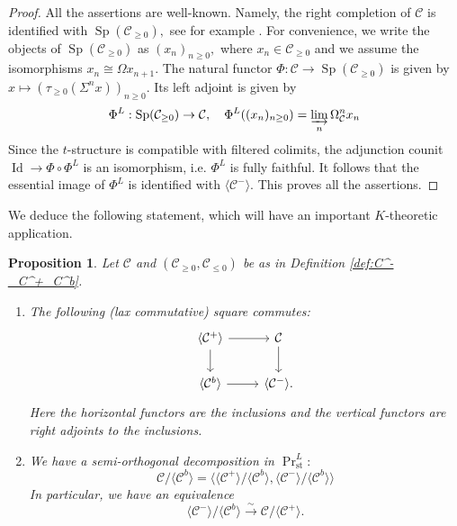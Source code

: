 \documentclass[11pt,leqno]{amsart}
\newtheorem{prop}[theo]{Proposition}
\numberwithin{equation}{section}
\newcommand{\indlim}[1][]{\mathop{\varinjlim}\limits_{#1}}
\newcommand{\xto}{\xrightarrow}
\newcommand{\st}{\operatorname{st}}
\newcommand{\cC}{{\mathcal C}}
\newcommand{\la}{\langle}
\newcommand{\ra}{\rangle}
\newcommand{\Id}{\operatorname{Id}}
\newcommand{\Sp}{\operatorname{Sp}}
\begin{document}
\begin{proof}
All the assertions are well-known. Namely, the right completion of $\cC$ is identified with $\Sp(\cC_{\geq 0}),$ see for example \cite[Lemma A.8]{AN21}. For convenience, we write the objects of $\Sp(\cC_{\geq 0})$ as $(x_n)_{n\geq 0},$ where $x_n\in\cC_{\geq 0}$ and we assume the isomorphisms $x_n\cong \Omega x_{n+1}.$ The natural functor $\Phi:\cC\to\Sp(\cC_{\geq 0})$ is given by $x\mapsto (\tau_{\geq 0}(\Sigma^n x))_{n\geq 0}.$ Its left adjoint is given by
\begin{equation*}
\Phi^L:\Sp(\cC_{\geq 0})\to\cC,\quad \Phi^L((x_n)_{n\geq 0}) = \indlim[n] \Omega_{\cC}^n x_n
\end{equation*}
Since the $t$-structure is compatible with filtered colimits, the adjunction counit $\Id\to \Phi\circ\Phi^L$ is an isomorphism, i.e. $\Phi^L$ is fully faithful. It follows that the essential image of $\Phi^L$ is identified with $\la \cC^-\ra.$ This proves all the assertions.
\end{proof}

We deduce the following statement, which will have an important $K$-theoretic application.

\begin{prop}\label{prop:SOD_for_C_mod_C^b}
Let $\cC$ and $(\cC_{\geq 0},\cC_{\leq 0})$ be as in Definition \ref{def:C^-_C^+_C^b}.
\begin{enumerate}[label=(\roman*),ref=(\roman*)]
	\item The following (lax commutative) square commutes:
	\begin{equation}\label{eq:Beck_Chevalley1}
		\begin{tikzcd}
			\la \cC^+\ra \ar[r]\ar[d] & \cC\ar[d]\\
			\la \cC^b\ra \ar[r] & \la \cC^-\ra.
		\end{tikzcd}
	\end{equation}
	Here the horizontal functors are the inclusions and the vertical functors are right adjoints to the inclusions. \label{Beck_Chevalley1}
	\item We have a semi-orthogonal decomposition in $\Pr^L_{\st}:$
	\begin{equation}\label{eq:SOD_for_C_mod_C^b}
		\cC/\la \cC^b\ra = \la \la \cC^+\ra/\la \cC^b\ra, \la \cC^-\ra/\la \cC^b\ra\ra
	\end{equation}
	In particular, we have an equivalence
	\begin{equation}\label{eq:equivalence_of_quotients1}
		\la \cC^-\ra/\la \cC^b\ra\xto{\sim} \cC/\la \cC^+\ra.
	\end{equation} \label{SOD_for_C_mod_C^b}
\end{enumerate} 
\end{prop}
\end{document}
